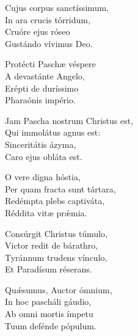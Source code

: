 Cujus corpus sanctíssimum,\\
In ara crucis tórridum,\\
Cruóre ejus róseo\\
Gustándo vívimus Deo.

Protécti Paschæ véspere\\
A devastánte Angelo,\\
Erépti de duríssimo\\
Pharaónis império.

Jam Pascha nostrum Christus est,\\
Qui immolátus agnus est:\\
Sinceritátis ázyma,\\
Caro ejus obláta est.

O vere digna hóstia,\\
Per quam fracta sunt tártara,\\
Redémpta plebs captiváta,\\
Réddita vitæ prǽmia.

Consúrgit Christus túmulo,\\
Victor redit de bárathro,\\
Tyránnum trudens vínculo,\\
Et Paradísum réserans.

Quǽsumus, Auctor ómnium,\\
In hoc pascháli gáudio,\\
Ab omni mortis ímpetu\\
Tuum defénde pópulum.

